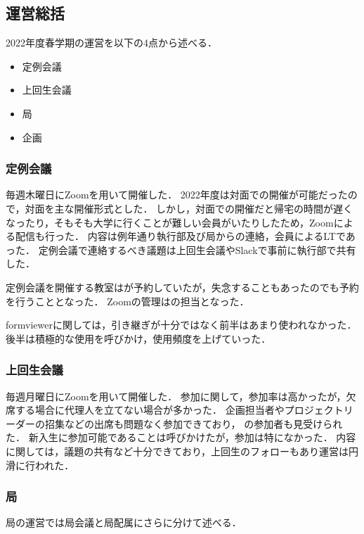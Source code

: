 \subsection*{運営総括}


2022年度春学期の運営を以下の4点から述べる．
\begin{itemize}
    \item 定例会議
    \item 上回生会議
    \item 局
    \item 企画
\end{itemize}

\subsubsection*{定例会議}
毎週木曜日にZoomを用いて開催した．
2022年度は対面での開催が可能だったので，対面を主な開催形式とした．
しかし，対面での開催だと帰宅の時間が遅くなったり，そもそも大学に行くことが難しい会員がいたりしたため，Zoomによる配信も行った．
内容は例年通り執行部及び局からの連絡，会員によるLTであった．
定例会議で連絡するべき議題は上回生会議やSlackで事前に執行部で共有した．

定例会議を開催する教室は\president{}が予約していたが，失念することもあったので\kensuiChief{}も予約を行うこととなった．
Zoomの管理は\subPresident{}の担当となった．

formviewerに関しては，引き継ぎが十分ではなく前半はあまり使われなかった．
後半は積極的な使用を呼びかけ，使用頻度を上げていった．

\subsubsection*{上回生会議}
毎週月曜日にZoomを用いて開催した．
参加に関して，参加率は高かったが，欠席する場合に代理人を立てない場合が多かった．
企画担当者やプロジェクトリーダーの招集などの出席も問題なく参加できており，
\fourthGrade{}の参加者も見受けられた．
新入生に参加可能であることは呼びかけたが，参加は特になかった．
内容に関しては，議題の共有など十分できており，上回生のフォローもあり運営は円滑に行われた．

\subsubsection*{局}
局の運営では局会議と局配属にさらに分けて述べる．
